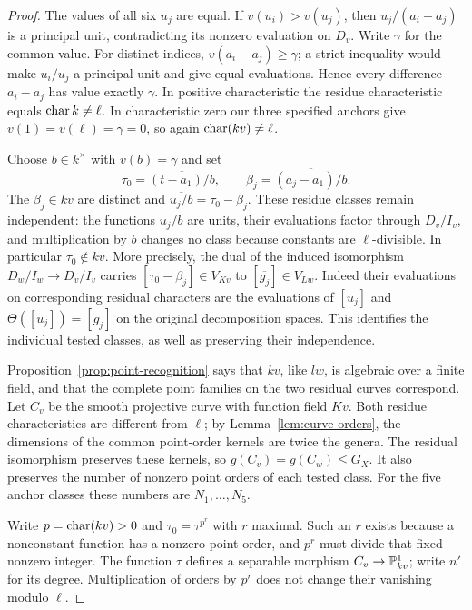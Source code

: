 \begin{proof}
The values of all six $u_j$ are equal.  If $v(u_i)>v(u_j)$, then
$u_j/(a_i-a_j)$ is a principal unit, contradicting its nonzero
evaluation on $D_v$.  Write $\gamma$ for the common value.
For distinct indices, $v(a_i-a_j)\ge\gamma$; a strict inequality
would make $u_i/u_j$ a principal unit and give equal evaluations.
Hence every difference $a_i-a_j$ has value exactly $\gamma$.
In positive characteristic the residue characteristic equals
$\operatorname{char} k\ne\ell$.  In characteristic zero our three specified
anchors give $v(1)=v(\ell)=\gamma=0$, so again
$\operatorname{char}(kv)\ne\ell$.

Choose $b\in k^\times$ with $v(b)=\gamma$ and set
\[
 \tau_0=\overline{(t-a_1)/b},\qquad
 \beta_j=\overline{(a_j-a_1)/b}.
\]
The $\beta_j\in kv$ are distinct and
$\overline{u_j/b}=\tau_0-\beta_j$.
These residue classes remain independent: the functions $u_j/b$ are
units, their evaluations factor through $D_v/I_v$, and multiplication
by $b$ changes no class because constants are $\ell$-divisible.
In particular $\tau_0\notin kv$.
More precisely, the dual of the induced isomorphism
$D_w/I_w\longrightarrow D_v/I_v$ carries
$[\tau_0-\beta_j]\in V_{Kv}$ to $[\overline{g_j}]\in V_{Lw}$.
Indeed their evaluations on corresponding residual characters are the
evaluations of $[u_j]$ and $\Theta([u_j])=[g_j]$ on the original
decomposition spaces.  This identifies the individual tested classes,
as well as preserving their independence.

Proposition~\ref{prop:point-recognition} says that $kv$, like $lw$,
is algebraic over a finite field, and that the complete point families
on the two residual curves correspond.  Let $C_v$ be the smooth
projective curve with function field $Kv$.
Both residue characteristics are different from $\ell$; by
Lemma~\ref{lem:curve-orders}, the dimensions of the common point-order
kernels are twice the genera.  The residual isomorphism preserves
these kernels, so $g(C_v)=g(C_w)\le G_X$.
It also preserves the number of nonzero point orders of each tested
class.  For the five anchor classes these numbers are $N_1,\ldots,N_5$.

Write $p=\operatorname{char}(kv)>0$ and $\tau_0=\tau^{p^r}$ with $r$ maximal.
Such an $r$ exists because a nonconstant function has a nonzero point
order, and $p^r$ must divide that fixed nonzero integer.
The function $\tau$ defines a separable morphism
$C_v\to\mathbb P_{kv}^1$; write $n'$ for its degree.
Multiplication of orders by $p^r$ does not change their vanishing
modulo $\ell$.


\end{proof}
